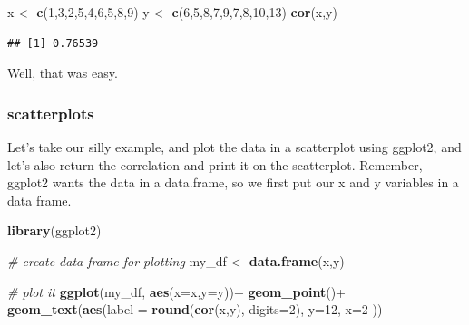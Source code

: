 \documentclass[]{book}
\newenvironment{Shaded}{\begin{snugshade}}{\end{snugshade}}
\newcommand{\KeywordTok}[1]{\textcolor[rgb]{0.13,0.29,0.53}{\textbf{{#1}}}}
\newcommand{\DataTypeTok}[1]{\textcolor[rgb]{0.13,0.29,0.53}{{#1}}}
\newcommand{\DecValTok}[1]{\textcolor[rgb]{0.00,0.00,0.81}{{#1}}}
\newcommand{\StringTok}[1]{\textcolor[rgb]{0.31,0.60,0.02}{{#1}}}
\newcommand{\CommentTok}[1]{\textcolor[rgb]{0.56,0.35,0.01}{\textit{{#1}}}}
\newcommand{\NormalTok}[1]{{#1}}
\theoremstyle{definition}
\theoremstyle{definition}
\theoremstyle{definition}
\theoremstyle{remark}
\begin{document}
\begin{Shaded}
\begin{Highlighting}[]
\NormalTok{x  <-}\StringTok{ }\KeywordTok{c}\NormalTok{(}\DecValTok{1}\NormalTok{,}\DecValTok{3}\NormalTok{,}\DecValTok{2}\NormalTok{,}\DecValTok{5}\NormalTok{,}\DecValTok{4}\NormalTok{,}\DecValTok{6}\NormalTok{,}\DecValTok{5}\NormalTok{,}\DecValTok{8}\NormalTok{,}\DecValTok{9}\NormalTok{)}
\NormalTok{y  <-}\StringTok{ }\KeywordTok{c}\NormalTok{(}\DecValTok{6}\NormalTok{,}\DecValTok{5}\NormalTok{,}\DecValTok{8}\NormalTok{,}\DecValTok{7}\NormalTok{,}\DecValTok{9}\NormalTok{,}\DecValTok{7}\NormalTok{,}\DecValTok{8}\NormalTok{,}\DecValTok{10}\NormalTok{,}\DecValTok{13}\NormalTok{)}
\KeywordTok{cor}\NormalTok{(x,y)}
\end{Highlighting}
\end{Shaded}

\begin{verbatim}
## [1] 0.76539
\end{verbatim}

Well, that was easy.

\subsubsection{scatterplots}\label{scatterplots}

Let's take our silly example, and plot the data in a scatterplot using
ggplot2, and let's also return the correlation and print it on the
scatterplot. Remember, ggplot2 wants the data in a data.frame, so we
first put our x and y variables in a data frame.

\begin{Shaded}
\begin{Highlighting}[]
\KeywordTok{library}\NormalTok{(ggplot2)}

\CommentTok{# create data frame for plotting}
\NormalTok{my_df <-}\StringTok{ }\KeywordTok{data.frame}\NormalTok{(x,y)}

\CommentTok{# plot it}
\KeywordTok{ggplot}\NormalTok{(my_df, }\KeywordTok{aes}\NormalTok{(}\DataTypeTok{x=}\NormalTok{x,}\DataTypeTok{y=}\NormalTok{y))+}
\StringTok{  }\KeywordTok{geom_point}\NormalTok{()+}
\StringTok{  }\KeywordTok{geom_text}\NormalTok{(}\KeywordTok{aes}\NormalTok{(}\DataTypeTok{label =} \KeywordTok{round}\NormalTok{(}\KeywordTok{cor}\NormalTok{(x,y), }\DataTypeTok{digits=}\DecValTok{2}\NormalTok{), }\DataTypeTok{y=}\DecValTok{12}\NormalTok{, }\DataTypeTok{x=}\DecValTok{2} \NormalTok{))}
\end{Highlighting}
\end{Shaded}
\end{document}
